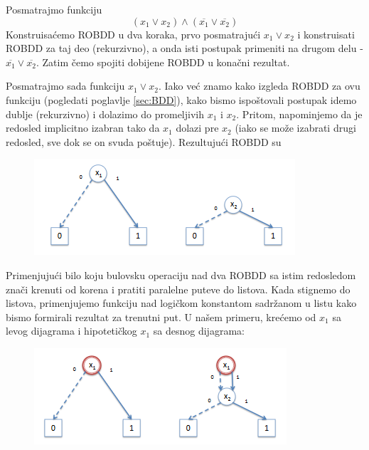 \begin{exmp}
    Posmatrajmo funkciju
    $$(x_{1} \vee x_{2}) \wedge (\overline{x_{1}} \vee \overline{x_{2}})$$
    Konstruisa\'c{}emo ROBDD u dva koraka, prvo posmatraju\'c{}i $x_{1} \vee x_{2}$ i konstruisati ROBDD za taj deo (rekurzivno), a onda isti postupak primeniti na drugom delu - $\overline{x_{1}} \vee \overline{x_{2}}$. Zatim \v{c}emo spojiti dobijene ROBDD u kona\v{c}ni rezultat.

    Posmatrajmo sada funkciju $x_{1} \vee x_{2}$. Iako ve\'c{} znamo kako izgleda ROBDD za ovu funkciju (pogledati poglavlje \ref{sec:BDD}), kako bismo ispo\v{s}tovali postupak idemo dublje (rekurzivno) i dolazimo do promeljivih $x_{1}$ i $x_{2}$. Pritom, napominjemo da je redosled implicitno izabran tako da $x_{1}$ dolazi pre $x_{2}$ (iako se mo\v{z}e izabrati drugi redosled, sve dok se on svuda po\v{s}tuje). Rezultuju\'c{}i ROBDD su

    \begin{figure}[H]
        \centering
        \includegraphics{slike/ROBDD_primer_1.PNG}
    \end{figure}

    Primenjuju\'c{}i bilo koju bulovsku operaciju nad dva ROBDD sa istim redosledom zna\v{c}i krenuti od korena i pratiti paralelne puteve do listova. Kada stignemo do listova, primenjujemo funkciju nad logi\v{c}kom konstantom sadr\v{z}anom u listu kako bismo formirali rezultat za trenutni put. U na\v{s}em primeru, kre\'c{}emo od $x_{1}$ sa levog dijagrama i hipoteti\v{c}kog $x_{1}$ sa desnog dijagrama:

    \begin{figure}[H]
        \centering
        \includegraphics{slike/ROBDD_primer_2.PNG}
    \end{figure}


\end{exmp}
